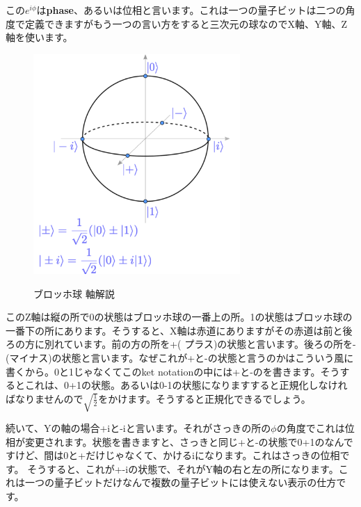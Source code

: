 この$e^{i\phi}$は\textbf{phase}、あるいは位相と言います。これは一つの量子ビットは二つの角度で定義できますがもう一つの言い方をすると三次元の球なのでX軸、Y軸、Z軸を使います。
\begin{figure}[H]
    \centering
    \includegraphics[width=0.7\textwidth]{lesson2/bloch_sphere_annotated.pdf}
    \label{fig: 1}
    \begin{center}
        \caption{ブロッホ球 軸解説}
    \end{center}
\end{figure}
このZ軸は縦の所で0の状態はブロッホ球の一番上の所。1の状態はブロッホ球の一番下の所にあります。そうすると、X軸は赤道にありますがその赤道は前と後ろの方に別れています。前の方の所を+( プラス)の状態と言います。後ろの所を-(マイナス)の状態と言います。なぜこれが+と-の状態と言うのかはこういう風に書くから。0と1じゃなくてこのket notationの中には+と-のを書きます。そうするとこれは、0+1の状態。あるいは0-1の状態になりますすると正規化しなければなりませんので$\sqrt{\frac{1}{2}}$をかけます。そうすると正規化できるでしょう。

続いて、Yの軸の場合+iと-iと言います。それがさっきの所の$\phi$の角度でこれは位相が変更されます。状態を書きますと、さっきと同じ+と-の状態で0+1のなんですけど、間は0と+だけじゃなくて、かけるiになります。これはさっきの位相です。
そうすると、これが+-iの状態で、それがY軸の右と左の所になります。これは一つの量子ビットだけなんで複数の量子ビットには使えない表示の仕方です。


